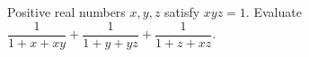 Positive real numbers $x,y,z$ satisfy $xyz=1$. Evaluate $\dfrac{1}{1+x+xy}+\dfrac{1}{1+y+yz}+\dfrac{1}{1+z+xz}$.
